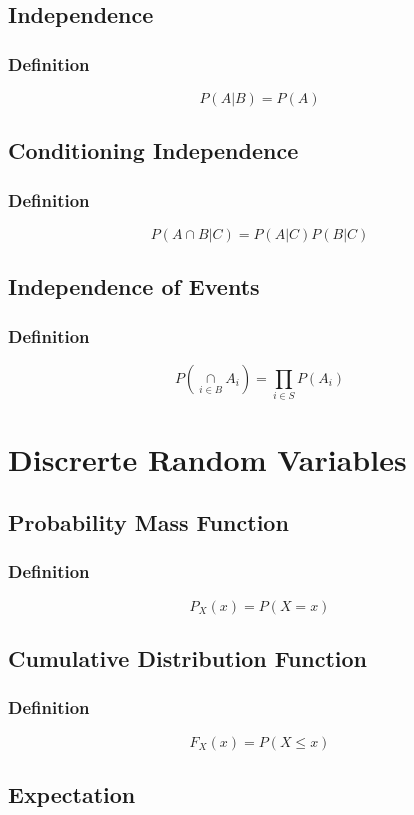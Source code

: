 \documentclass[11pt]{article}
\begin{document}
\subsection{Independence}
\subsubsection{Definition}
$$P(A|B) = P(A)$$

\subsection{Conditioning Independence}
\subsubsection{Definition}
$$P(A\cap B|C) = P(A|C) P(B|C)$$

\subsection{Independence of Events}
\subsubsection{Definition}
$$P\left(\underset{i\in B}{\cap} A_i \right) = \underset{i\in S}{\prod}P(A_i)$$

\section{Discrerte Random Variables}
\subsection{Probability Mass Function}
\subsubsection{Definition}
$$P_X (x) = P({X=x})$$

\subsection{Cumulative Distribution Function}
\subsubsection{Definition}
$$F_X (x) = P(X \leq x)$$

\subsection{Expectation}
\end{document}
